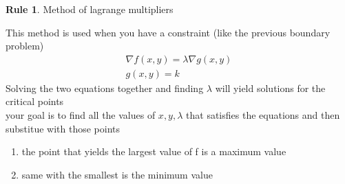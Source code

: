 \documentclass[11pt]{article}
\theoremstyle{definition}
\newtheorem{reg}{Rule}
\begin{document}
\begin{reg}
Method of lagrange multipliers
\end{reg}
This method is used when you have a constraint (like the previous boundary problem)
\begin{align}
	\nabla f(x,y) = \lambda \nabla g(x,y) \\
	g(x,y) = k
\end{align}
Solving the two equations together and finding $\lambda$ will yield solutions for the critical points \\
your goal is to find all the values of $x,y,\lambda$ that satisfies the equations and then substitue with those points
\begin{enumerate}

\item the point that yields the largest value of f is a maximum value
\item same with the smallest is the minimum value 

\end{enumerate}
\end{document}
